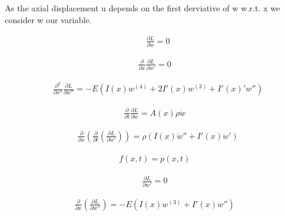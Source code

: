 As the axial displacement u depends on the first derviative of w w.r.t. x we consider w our variable.

\begin{equation}
    \begin{split}
        &\frac{\partial L}{\partial w} = 0
    \end{split}
\end{equation}

\begin{equation}
    \begin{split}
        \frac{\partial}{\partial x}\frac{\partial L}{\partial w'} = 0 
    \end{split}
\end{equation}

\begin{equation}
    \begin{split}
        &\frac{\partial^2}{\partial x^2}\frac{\partial L}{\partial w''} = -E\left(I(x)w^{(4)}+2I'(x)w^{(3)}+I'(x)'w''\right)
    \end{split}
\end{equation}

\begin{equation}
    \begin{split}
        \frac{\partial}{\partial t}\frac{\partial L}{\partial \dot w} = A(x)\rho \ddot w
    \end{split}
\end{equation}

\begin{equation}
    \begin{split}
        &\frac{\partial}{\partial x}\left(\frac{\partial}{\partial t}\left(\frac{\partial L}{\partial \dot w'}\right)\right) = \rho \left(I(x)\ddot w''+I'(x)\ddot w'\right)
    \end{split}
\end{equation}

\begin{equation}
    \begin{split}
        f(x,t) = p(x,t)
    \end{split}
\end{equation}

\begin{equation}
    \begin{split}
        \frac{\partial L }{\partial w'}= 0
    \end{split}
\end{equation}

\begin{equation}
    \begin{split}
        \frac{\partial}{\partial x}(\frac{\partial L}{\partial  w''}) = -E\left(I(x)w^{(3)}+I'(x)w''\right)
    \end{split}
\end{equation}

